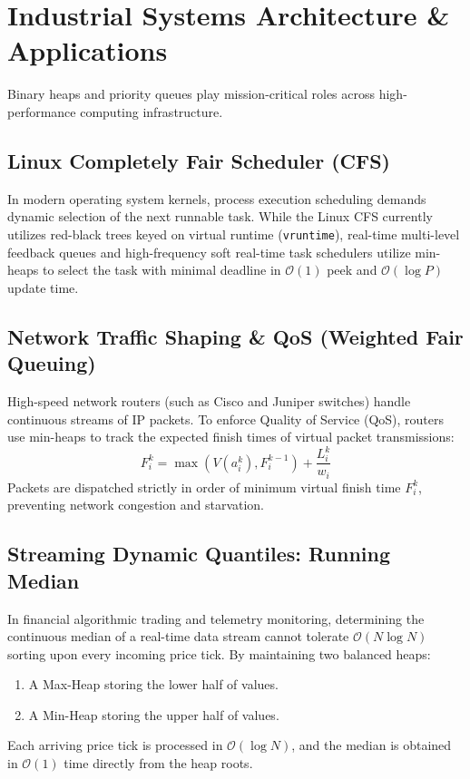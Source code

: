 \documentclass[10pt,twocolumn,letterpaper]{article}
\begin{document}
\section{Industrial Systems Architecture \& Applications}
\label{sec:systems}

Binary heaps and priority queues play mission-critical roles across high-performance computing infrastructure.

\subsection{Linux Completely Fair Scheduler (CFS)}
In modern operating system kernels, process execution scheduling demands dynamic selection of the next runnable task. While the Linux CFS currently utilizes red-black trees keyed on virtual runtime (\texttt{vruntime}), real-time multi-level feedback queues and high-frequency soft real-time task schedulers utilize min-heaps to select the task with minimal deadline in $\mathcal{O}(1)$ peek and $\mathcal{O}(\log P)$ update time.

\subsection{Network Traffic Shaping \& QoS (Weighted Fair Queuing)}
High-speed network routers (such as Cisco and Juniper switches) handle continuous streams of IP packets. To enforce Quality of Service (QoS), routers use min-heaps to track the expected finish times of virtual packet transmissions:
\begin{equation}
F_i^k = \max(V(a_i^k), F_i^{k-1}) + \frac{L_i^k}{w_i}
\end{equation}
Packets are dispatched strictly in order of minimum virtual finish time $F_i^k$, preventing network congestion and starvation.

\subsection{Streaming Dynamic Quantiles: Running Median}
In financial algorithmic trading and telemetry monitoring, determining the continuous median of a real-time data stream cannot tolerate $\mathcal{O}(N \log N)$ sorting upon every incoming price tick. By maintaining two balanced heaps:
\begin{enumerate}
    \item A Max-Heap storing the lower half of values.
    \item A Min-Heap storing the upper half of values.
\end{enumerate}
Each arriving price tick is processed in $\mathcal{O}(\log N)$, and the median is obtained in $\mathcal{O}(1)$ time directly from the heap roots.
\end{document}
